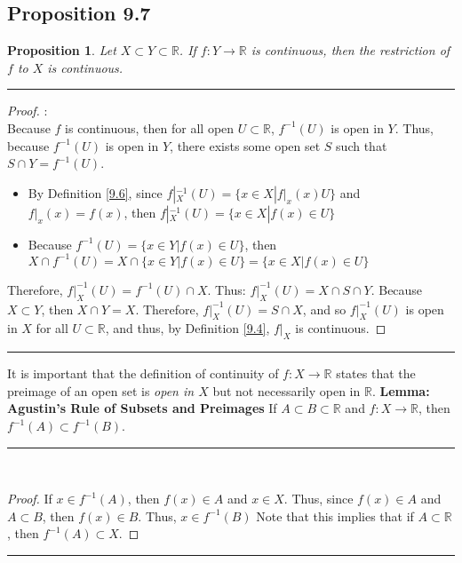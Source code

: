 \documentclass[openany, amssymb, psamsfonts]{amsart}
\newcommand{\bbR}{\mathbb{R}}
\newcommand{\arr}{\longrightarrow}
\newtheorem{prop}{Proposition}[section]
\theoremstyle{definition}
\numberwithin{equation}{section}
\begin{document}
\subsection*{Proposition 9.7}
\begin{prop}
\label{9.7}
Let $X\subset Y\subset \bbR$. If $f\colon Y\to \bbR$ is continuous, then the restriction of $f$ to $X$ is continuous.
\end{prop}
\vspace{4pt}     \hrule   \vspace{4pt} \begin{proof}:\\
    Because $f$ is continuous, then for all open $U \subset \bbR$, $f^{-1}(U)$ is open in $Y$. Thus, because $f^{-1}(U)$ is open in $Y$, there exists some open set $S$ such that $S\cap Y = f^{-1}(U)$. \begin{itemize}
        \item By Definition \ref{9.6}, since $f|_X^{-1}(U) = \{x\in X | f|_x(x)U\}$ and $f|_x(x) = f(x)$, then $f|_X^{-1}(U) = \{x\in X | f(x)\in U\}$
        \item Because $f^{-1}(U) = \{x\in Y | f(x) \in U\}$, then $X\cap f^{-1}(U) = X\cap \{x\in Y | f(x) \in U\} = \{x\in X | f(x) \in U\}$
    \end{itemize}
Therefore, $f|_X^{-1}(U) = f^{-1}(U) \cap X$. Thus: $f|_X^{-1}(U) = X\cap S \cap Y$. Because $X\subset Y$, then $X \cap Y = X$. Therefore, $f|_X^{-1}(U) = S \cap X$, and so $f|_X^{-1}(U)$ is open in $X$ for all $U\subset \bbR$, and thus, by Definition \ref{9.4}, $f|_X$ is continuous. 
\end{proof}\vspace{4pt}     \hrule   \vspace{4pt}

It is important that the definition of continuity of $f\colon X\arr \bbR$ states that the preimage of an open set is 
{\em open in $X$} but not necessarily open in $\bbR$. 
\newpage
\textbf{Lemma: Agustin's Rule of Subsets and Preimages} If $A\subset B\subset \bbR$ and $f\colon X\arr \bbR$, then $f^{-1}(A)\subset f^{-1}(B)$.
\vspace{4pt}     \hrule   \vspace{4pt} \
\begin{proof}
If $x\in f^{-1}(A)$, then $f(x) \in A$ and $x\in X$. Thus, since $f(x) \in A$ and $A\subset B$, then $f(x) \in B$. Thus, $x\in f^{-1}(B)$ Note that this implies that if $A\subset \bbR$, then $f^{-1}(A) \subset X$.
\end{proof}  \vspace{4pt}     \hrule   \vspace{4pt}
\end{document}
